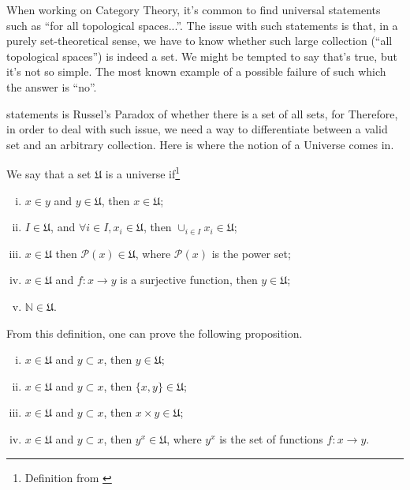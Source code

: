 When working on Category Theory, it's common to find universal
statements such as ``for all topological spaces...''. The issue
with such statements is that, in a purely set-theoretical sense,
we have to know whether such large collection (``all topological spaces'')
is indeed a set. We might be tempted to say that's true, but
it's not so simple. The most known example of a possible failure of such
which the answer is ``no''.

statements is Russel's Paradox of whether there is a set of all sets, for
Therefore, in order to deal with such issue, we need a way to differentiate
between a valid set and an arbitrary collection. Here is where the notion of a Universe comes in.

\begin{definition}[Universe]
  We say that a set $\mathfrak U$ is a universe if\footnote{Definition from \citet{borceux1994handbook}}
  \begin{enumerate}[(i)]
    \item $x\in y$ and $ y\in \mathfrak U$, then $x \in \mathfrak U$;
    \item $I \in \mathfrak U$, and $\forall i \in I, x_i \in \mathfrak U$, then $\cup_{i\in I}x_i \in \mathfrak U$;
    \item $x \in \mathfrak U$ then $\mathcal P(x) \in \mathfrak U$, where $\mathcal P(x)$ is the power set;
    \item $x \in \mathfrak U$ and $f:x\to y$ is a surjective function, then $y \in \mathfrak U$;
    \item $\mathbb N \in \mathfrak U$.
  \end{enumerate}
\end{definition}

From this definition, one can prove the following proposition.
\begin{proposition}
  \begin{enumerate}[(i)]
    \item $x \in \mathfrak U$ and $y \subset x$, then $y \in \mathfrak U$;
    \item $x \in \mathfrak U$ and $y \subset x$, then $\{x,y\} \in \mathfrak U$;
    \item $x \in \mathfrak U$ and $y \subset x$, then $x\times y \in \mathfrak U$;
    \item $x \in \mathfrak U$ and $y \subset x$, then $y^x \in \mathfrak U$, where $y^x$ is the set of functions $f:x \to y$.
  \end{enumerate}
  \label{prop:universe}
\end{proposition}

